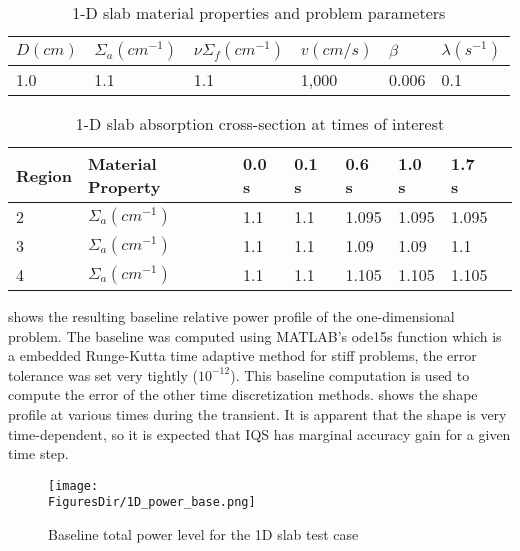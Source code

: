 \begin{table}[!htbp]
\begin{center}
\caption{1-D slab material properties and problem parameters}
\label{tab:1Dmat}
\begin{tabular}{llllll}
\hline
$D (cm)$ & $\Sigma_a (cm^{-1})$ & $\nu \Sigma_f (cm^{-1})$ & $v (cm/s)$ & $\beta$ & $\lambda (s^{-1})$ \\
\hline
1.0 & 1.1 & 1.1 & 1,000 & 0.006 & 0.1 \\

\hline
\end{tabular}
\end{center}
\end{table}

\begin{table}[!htbp]
\begin{center}
\caption{1-D slab absorption cross-section at times of interest}
\label{tab:1Dslope}
\begin{tabular}{llllllll}
\hline
Region & Material Property & 0.0 s & 0.1 s & 0.6 s & 1.0 s & 1.7 s \\
\hline
2 & $\Sigma_{a} (cm^{-1})$ & 1.1 & 1.1 & 1.095 & 1.095 & 1.095 \\
3 & $\Sigma_{a} (cm^{-1})$ & 1.1 & 1.1 & 1.09 & 1.09 & 1.1 \\
4 & $\Sigma_{a} (cm^{-1})$ & 1.1 & 1.1 & 1.105 & 1.105 & 1.105 \\
\hline
\end{tabular}
\end{center}
\end{table}

 shows the resulting baseline relative power profile of the one-dimensional problem.  The baseline was computed using MATLAB's ode15s function which is a embedded Runge-Kutta time adaptive method for stiff problems, the error tolerance was set very tightly ($10^{-12}$).  This baseline computation is used to compute the error of the other time discretization methods.   shows the shape profile at various times during the transient.  It is apparent that the shape is very time-dependent, so it is expected that IQS has marginal accuracy gain for a given time step.

\begin{figure}[!htbp]
\begin{center}
\texttt{[image: \\FiguresDir/1D\_power\_base.png]}
\caption{Baseline total power level for the 1D slab test case}
\label{fig:1D_power}
\end{center}
\end{figure}

